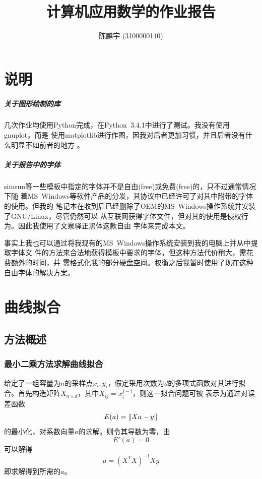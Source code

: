 \documentclass[10pt,a4paper]{article}
\theoremstyle{mythm}%
\numberwithin{equation}{section}
\DeclarePairedDelimiter\norm{\lVert}{\rVert}%
\begin{document}
\setlength{\abovedisplayskip}{1ex} %
\setlength{\belowdisplayskip}{1ex} %
\begin{CJK*}{UTF8}{wqyzh}

\author{陈鹏宇 (3100000140)}                                 %
\title{计算机应用数学的作业报告}              %
\maketitle                                           %

\section*{说明}

\subparagraph{关于图形绘制的库}

几次作业均使用Python完成，在Python~3.4.1中进行了测试。我没有使用gnuplot，而是
使用matplotlib进行作图，因我对后者更加习惯，并且后者没有什么明显不如前者的地方
。

\subparagraph{关于报告中的字体}

simsun等一些模板中指定的字体并不是自由(free)或免费(free)的，只不过通常情况下随
着MS~Windows等软件产品的分发，其协议中已经许可了对其中附带的字体的使用。但我的
笔记本在收到后已经删除了OEM的MS~Windows操作系统并安装了GNU/Linux，尽管仍然可以
从互联网获得字体文件，但对其的使用是侵权行为。因此我使用了文泉驿正黑体这款自由
字体来完成本文。

事实上我也可以通过将我现有的MS~Windows操作系统安装到我的电脑上并从中提取字体文
件的方法来合法地获得模板中要求的字体，但这种方法代价稍大，需花费额外的时间，并
需格式化我的部分硬盘空间。权衡之后我暂时使用了现在这种自由字体的解决方案。

\section{曲线拟合}

\subsection{方法概述}

\subsubsection{最小二乘方法求解曲线拟合}

给定了一组容量为$n$的采样点$x_i, y_i$，假定采用次数为$d$的多项式函数对其进行拟
合。首先构造矩阵$X_{n\times d}$，其中$X_{i j} = x_i^{j-i}$，则这一拟合问题可被
表示为通过对误差函数
\begin{equation}
    E(a) = \norm{Xa - y}
\end{equation}
的最小化，对系数向量$a$的求解。则令其导数为零，由
\begin{equation}
    E'(a) = 0
\end{equation}
可以解得
\begin{equation}
    a = (X^T X)^{-1}Xy
\end{equation}
即求解得到所需的$a$。


\end{CJK*}
\end{document}
